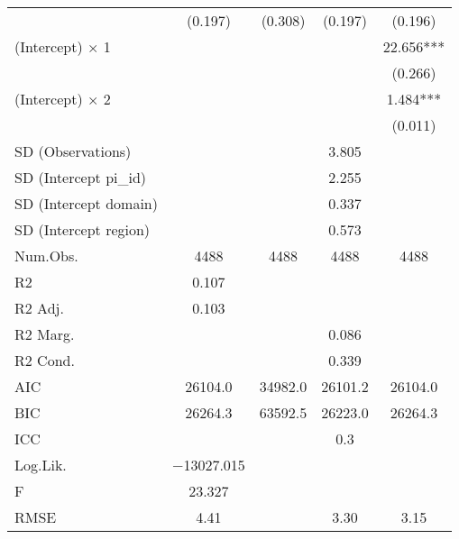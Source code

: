 \begin{table}
\begin{tabular}[t]{lcccc}
 & (\num{0.197}) & (\num{0.308}) & (\num{0.197}) & (\num{0.196})\\
(Intercept) × 1 &  &  &  & \num{22.656}***\\
 &  &  &  & (\num{0.266})\\
(Intercept) × 2 &  &  &  & \num{1.484}***\\
 &  &  &  & (\num{0.011})\\
SD (Observations) &  &  & \num{3.805} & \\
SD (Intercept pi\_id) &  &  & \num{2.255} & \\
SD (Intercept domain) &  &  & \num{0.337} & \\
SD (Intercept region) &  &  & \num{0.573} & \\
\midrule
Num.Obs. & \num{4488} & \num{4488} & \num{4488} & \num{4488}\\
R2 & \num{0.107} &  &  & \\
R2 Adj. & \num{0.103} &  &  & \\
R2 Marg. &  &  & \num{0.086} & \\
R2 Cond. &  &  & \num{0.339} & \\
AIC & \num{26104.0} & \num{34982.0} & \num{26101.2} & \num{26104.0}\\
BIC & \num{26264.3} & \num{63592.5} & \num{26223.0} & \num{26264.3}\\
ICC &  &  & \num{0.3} & \\
Log.Lik. & \num{-13027.015} &  &  & \\
F & \num{23.327} &  &  & \\
RMSE & \num{4.41} &  & \num{3.30} & \num{3.15}\\
\bottomrule
\end{tabular}
\end{table}
